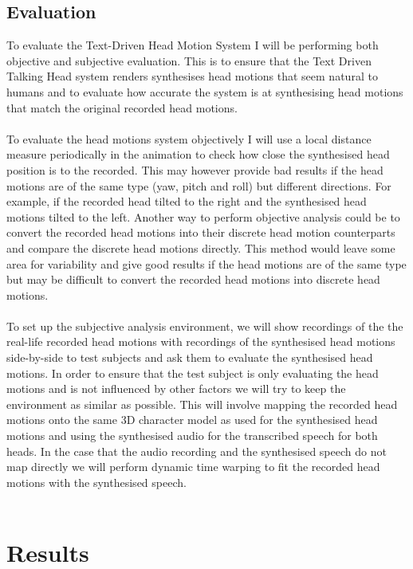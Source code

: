 \documentclass[bsc,frontabs,twoside,singlespacing,parskip]{infthesis}
\begin{document}
\section{Evaluation}
To evaluate the Text-Driven Head Motion System I will be performing both objective  and subjective evaluation. This is to ensure that the Text Driven Talking Head system renders synthesises head motions that seem natural to humans and to evaluate how accurate the system is at synthesising head motions that match the original recorded head motions.
\\
\\
To evaluate the head motions system objectively I will use a local distance measure periodically in the animation to check how close the synthesised head position is to the recorded. This may however provide bad results if the head motions are of the same type (yaw, pitch and roll) but different directions. For example, if the recorded head tilted to the right and the synthesised head motions tilted to the left. Another way to perform objective analysis could be to convert the recorded head motions into their discrete head motion counterparts and compare the discrete head motions directly. This method would leave some area for variability and give good results if the head motions are of the same type but may be difficult to convert the recorded head motions into discrete head motions.
\\
\\
To set up the subjective analysis environment, we will show recordings of  the the real-life recorded head motions with recordings of the synthesised head motions side-by-side to test subjects and ask them to evaluate the synthesised head motions. In order to ensure that the test subject is only evaluating the head motions and is not influenced by other factors we will try to keep the environment as similar as possible. This will involve mapping the recorded head motions onto the same 3D character model as used for the synthesised head motions and using the synthesised audio for the transcribed speech for both heads. In the case that the audio recording and the synthesised speech do not map directly we will perform dynamic time warping to fit the recorded head motions with the synthesised speech.
\\
\\
\chapter{Results}




\end{document}
